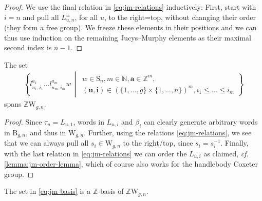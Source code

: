\documentclass[a4paper,11pt]{amsart}
\newcommand{\cf}{\textsl{cf.}}
\renewcommand{\dots}{\text{...}}
\newcommand{\setstuff}[1]{\mathrm{#1}}
\newcommand{\Z}{\mathbb{Z}}
\newcommand{\N}{\mathbb{N}}
\newcommand{\bsym}[1]{\boldsymbol{#1}}
\newcommand{\jm}{L}
\newcommand{\jmc}{l}
\numberwithin{equation}{section}
\let\fullref\autoref
\begin{document}
\begin{proof}
We use the final relation in \eqref{eq:jm-relations}
inductively: First, start with $i=n$ and pull 
all $\jm_{u,n}^{\pm}$, for all $u$, to the right=top, 
without changing their order (they form a free group).
We freeze these elements in their positions and
we can thus use induction 
on the remaining Jucys--Murphy elements 
as their maximal second index is $n-1$.
\end{proof}

\begin{lemma}\label{lemma:jm-elements-span}
The set
\begin{gather}\label{eq:jm-basis}
\left\{ 
\jmc_{u_{1},i_{1}}^{a_{1}}\dots 
\jmc_{u_{m},i_{m}}^{a_{m}}w 
\,\middle\vert\,
\begin{gathered}
w\in\setstuff{S}_{n},
m\in\N,
\bsym{a}\in\Z^{m},
\\
(\bsym{u},\bsym{i})\in(\{1,\dots,g\}\times\{1,\dots,n\})^{m},
i_{1}\leq\dots\leq i_{m}
\end{gathered}
\right\}
\end{gather}
spans $\Z\setstuff{W}_{g,n}$.
\end{lemma}

\begin{proof}
Since $\tau_{u}=\jm_{u,1}$, words in 
$\jm_{u,i}$ and $\beta_{i}$ can clearly 
generate arbitrary words in $\setstuff{B}_{g,n}$, and thus in 
$\setstuff{W}_{g,n}$.
Further, using the relations \eqref{eq:jm-relations}, 
we see that we can always pull all
$s_{i}\in\setstuff{W}_{g,n}$ to the right/top, since 
$s_{i}=s_{i}^{-1}$. Finally, with the last 
relation in \eqref{eq:jm-relations} we can order the $\jm_{u,i}$ 
as claimed, {\cf} \fullref{lemma:jm-order-lemma}, which of course 
also works for the handlebody Coxeter group.
\end{proof}

\begin{proposition}\label{proposition:jm-elements-basis}
The set in \eqref{eq:jm-basis}
is a $\Z$-basis of $\Z\setstuff{W}_{g,n}$.
\end{proposition}
\end{document}
